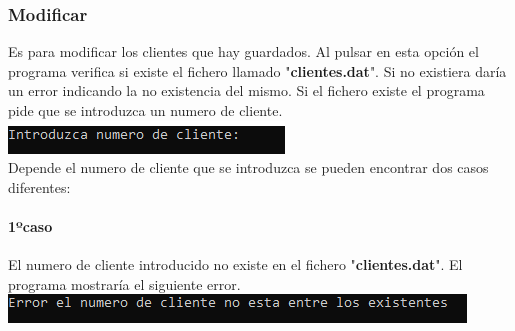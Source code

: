\documentclass[12pt]{article}
\begin{document}
\subsubsection{Modificar}
   Es para modificar los clientes que hay guardados. Al pulsar en esta opción el programa verifica si existe el fichero llamado "\textbf{clientes.dat}". Si no existiera daría un error indicando la no existencia del mismo. Si el fichero existe el programa pide que se introduzca un numero de cliente.\\
    \includegraphics[]{PedirNumeroDeCliente.PNG}\\
    Depende el numero de cliente que se introduzca se pueden encontrar dos casos diferentes:
    \paragraph{1ºcaso}
    El numero de cliente introducido no existe en el fichero "\textbf{clientes.dat}". El programa mostraría el siguiente error.\\
    \includegraphics[]{ErrorNumeroClientesNoExistente.PNG}
\end{document}
